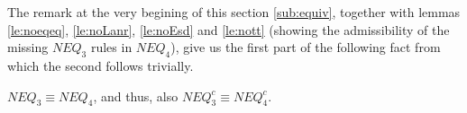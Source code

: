 \noindent
The remark at the very begining of this section \ref{sub:equiv}, together with lemmas
\ref{le:noeqeq}, \ref{le:noLanr}, \ref{le:noEsd} and
\ref{le:nott} (showing the admissibility of the 
missing $NEQ_{3}$ rules in $NEQ_{4}$), give us the first part of the 
following fact from which the second follows trivially.
\begin{CLAIM}\label{le:neq3isneq4}
$NEQ_3\equiv NEQ_4$, and thus, also $NEQ_{3}^{c}\equiv NEQ_{4}^{c}$.
\end{CLAIM}

